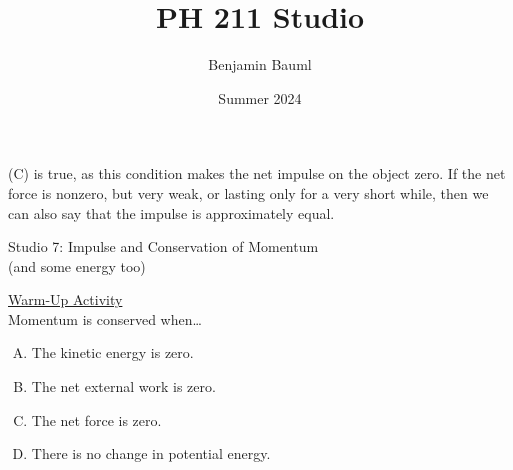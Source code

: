 \documentclass[]{article}
\title{PH 211 Studio \Week}
\author{Benjamin Bauml}
\date{Summer 2024}
\begin{document}
\begin{TeacherMargin}
\noindent (C) is true, as this condition makes the net impulse on the object zero. If the net force is nonzero, but very weak, or lasting only for a very short while, then we can also say that the impulse is approximately equal.
\end{TeacherMargin}
\begin{PresentSpace}
\begin{center}
	\huge Studio 7: Impulse and Conservation of Momentum \\
	\large (and some energy too)
	\vspace{1cm}
\end{center}
\underline{Warm-Up Activity} \\
Momentum is conserved when\dots
\begin{enumerate}[(A)]
	\item The kinetic energy is zero.
	\item The net external work is zero.
	\item The net force is zero.
	\item There is no change in potential energy.
\end{enumerate}
\end{PresentSpace}
\newpage
\end{document}
